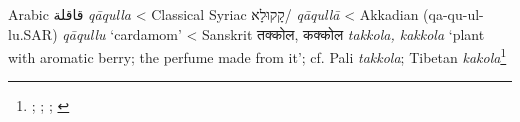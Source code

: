 \begin{etymology}\label{ety:qaqulla}
Arabic {قاقلة} \textit{qāqulla}
< Classical Syriac {{קָקוּלָא}/} \textit{qāqullā}
< Akkadian { (qa-qu-ul-lu.SAR)} \textit{qāqullu} `cardamom'
< Sanskrit {तक्कोल, कक्कोल} \textit{takkola, kakkola} `plant with aromatic berry; the perfume made from it'; cf. Pali \textit{takkola}; Tibetan  \textit{kakola}\footnote{\textcite[863]{wehr_dictionary_1976}; \textcite[vol. 1, p. 489]{low_flora_1924}; \textcite[58]{zimmern_akkadische_1915}; \textcite[431, 241]{monier-williams_sanskrit-english_1899}}
\end{etymology}